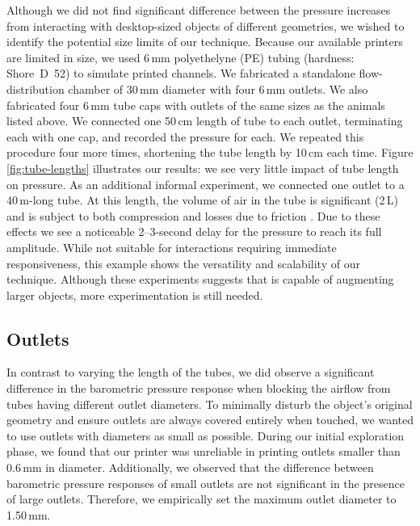 		    Although we did not find significant difference between the pressure
		    increases from interacting with desktop-sized objects of different
		    geometries, we wished to identify the potential size limits of our
		    technique. Because our available printers are limited in size, we used
		    6\,mm polyethelyne (PE) tubing (hardness: Shore~D~52) to simulate
		    printed channels. We fabricated a standalone flow-distribution chamber
		    of 30\,mm diameter with four 6\,mm outlets. We also fabricated four
		    6\,mm tube caps with outlets of the same sizes as the animals listed
		    above. We connected one 50\,cm length of tube to each outlet,
		    terminating each with one cap, and recorded the pressure for each. We
		    repeated this procedure four more times, shortening the tube length by
		    10\,cm each time. Figure \ref{fig:tube-lengths} illustrates our results: we
		    see very little impact of tube length on pressure. As an additional
		    informal experiment, we connected one outlet to a 40\,m-long tube. At
		    this length, the volume of air in the tube is significant (2\,L) and is
		    subject to both compression and losses due to friction
		    \cite{Brown:2002it}. Due to these effects we see a noticeable
		    2--3-second delay for the pressure to reach its full amplitude. While
		    not suitable for interactions requiring immediate responsiveness, this
		    example shows the versatility and scalability of our technique. Although
		    these experiments suggests that \at is capable of augmenting larger
		    objects, more experimentation is still needed.
		    
			\subsection{Outlets}
				In contrast to varying the length of the tubes, we did observe a
				significant difference in the barometric pressure response when blocking
				the airflow from tubes having different outlet diameters. To minimally
				disturb the object's original geometry and ensure outlets are always
				covered entirely when touched, we wanted to use outlets with diameters
				as small as possible. During our initial exploration phase, we found
				that our printer was unreliable in printing outlets smaller than 0.6\,mm
				in diameter. Additionally, we observed that the difference between
				barometric pressure responses of small outlets are not significant in
				the presence of large outlets. Therefore, we empirically set the maximum
				outlet diameter to 1.50\,mm.
            
